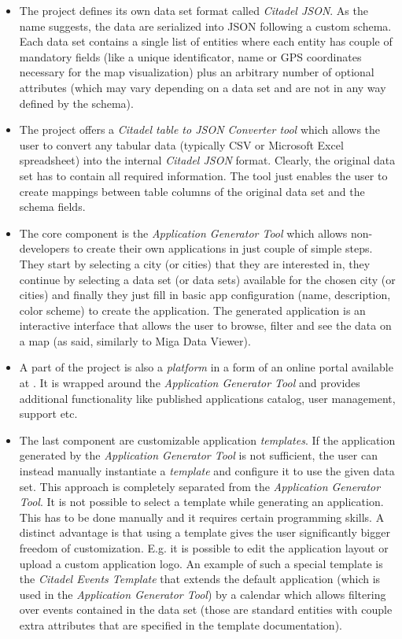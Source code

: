 \begin{itemize}
\item The project defines its own data set format called \emph{Citadel JSON}. As the name suggests, the data are serialized into JSON following a custom schema. Each data set contains a single list of entities where each entity has couple of mandatory fields (like a unique identificator, name or GPS coordinates necessary for the map visualization) plus an arbitrary number of optional attributes (which may vary depending on a data set and are not in any way defined by the schema). 
\item The project offers a \emph{Citadel table to JSON Converter tool} which allows the user to convert any tabular data (typically CSV or Microsoft Excel spreadsheet) into the internal \emph{Citadel JSON} format. Clearly, the original data set has to contain all required information. The tool just enables the user to create mappings between table columns of the original data set and the schema fields.
\item The core component is the \emph{Application Generator Tool} which allows non-developers to create their own applications in just couple of simple steps. They start by selecting a city (or cities) that they are interested in, they continue by selecting a data set (or data sets) available for the chosen city (or cities) and finally they just fill in basic app configuration (name, description, color scheme) to create the application. The generated application is an interactive interface that allows the user to browse, filter and see the data on a map (as said, similarly to Miga Data Viewer).
\item A part of the project is also a \emph{platform} in a form of an online portal available at \cite{citadel_home}. It is wrapped around the  \emph{Application Generator Tool} and provides additional functionality like published applications catalog, user management, support etc.
\item The last component are customizable application \emph{templates}. If the application generated by the \emph{Application Generator Tool} is not sufficient, the user can instead manually instantiate a \emph{template} and configure it to use the given data set. This approach is completely separated from the \emph{Application Generator Tool}. It is not possible to select a template while generating an application. This has to be done manually and it requires certain programming skills. A distinct advantage is that using a template gives the user significantly bigger freedom of customization. E.g. it is possible to edit the application layout or upload a custom application logo. An example of such a special template is the \emph{Citadel Events Template} that extends the default application (which is used in the \emph{Application Generator Tool}) by a calendar which allows filtering over events contained in the data set (those are standard entities with couple extra attributes that are specified in the template documentation).
\end{itemize}

